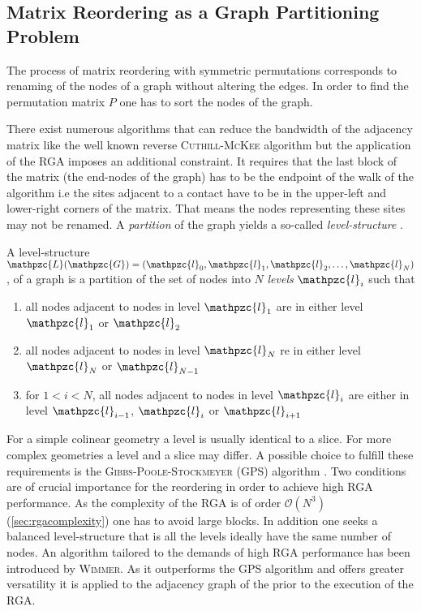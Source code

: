 \subsection{Matrix Reordering as a Graph Partitioning Problem}
The process of matrix reordering with symmetric permutations corresponds to renaming of the nodes of a graph without altering the edges. In order to find the permutation matrix $P$ one has to sort the nodes of the graph.\par
There exist numerous algorithms that can reduce the bandwidth of the adjacency matrix like the well known reverse \textsc{Cuthill-McKee} algorithm but the application of the RGA imposes an additional constraint. It requires that the last block of the matrix (the end-nodes of the graph) has to be the endpoint of the walk of the algorithm i.e the sites adjacent to a contact have to be in the upper-left and lower-right corners of the matrix. That means the nodes representing these sites may not be renamed. A \emph{partition} of the graph yields a so-called \emph{level-structure} \cite{gibbs.Siam.13.236}.
\begin{dfn}
A level-structure $\mathpzc{L}(\mathpzc{G}) = (\mathpzc{l}_0,\mathpzc{l}_1,\mathpzc{l}_2,\dotsc,\mathpzc{l}_N)$, of a graph  is a partition of the set of nodes  into $N$ \emph{levels} $\mathpzc{l}_i$ such that
\begin{enumerate}
\item all nodes adjacent to nodes in level $\mathpzc{l}_1$ are in either level $\mathpzc{l}_1$ or $\mathpzc{l}_2$
\item all nodes adjacent to nodes in level $\mathpzc{l}_N$ re in either level $\mathpzc{l}_{N}$ or $\mathpzc{l}_{N-1}$
\item for $1 < i < N$, all nodes adjacent to nodes in level $\mathpzc{l}_{i}$ are either in level $\mathpzc{l}_{i-1}$, $\mathpzc{l}_{i}$ or $\mathpzc{l}_{i+1}$
\end{enumerate}
\end{dfn}
For a simple colinear geometry a level is usually identical to a slice. For more complex geometries a level and a slice may differ. A possible choice to fulfill these requirements is the \textsc{Gibbs-Poole-Stockmeyer} (GPS) algorithm \cite{gibbs.Siam.13.236}. Two conditions are of crucial importance for the reordering in order to achieve high RGA performance. As the complexity of the RGA is of order $\mathcal{O}(N^3)$(\cref{sec:rgacomplexity}) one has to avoid large blocks. In addition one seeks a balanced level-structure that is all the levels ideally have the same number of nodes.
An algorithm tailored to the demands of high RGA performance has been introduced by \textsc{Wimmer}. As it outperforms the GPS algorithm and offers greater versatility \cite{Wimmer2009JComPhys} it is applied to the adjacency graph of the \hamil{} prior to the execution of the RGA.
